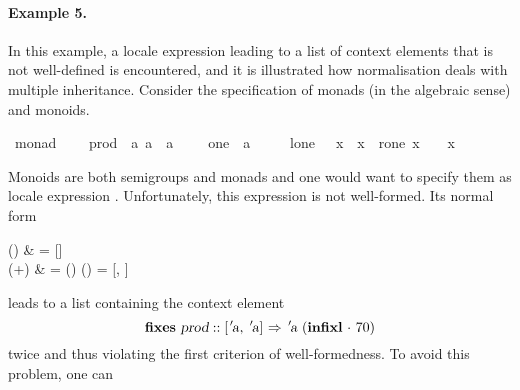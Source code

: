\begin{isabellebody}
\begin{isamarkuptext}
\paragraph{Example 5.}
  In this example, a locale expression leading to a list of context
  elements that is not well-defined is encountered, and it is illustrated
  how normalisation deals with multiple inheritance.
  Consider the specification of monads (in the algebraic sense)
  and monoids.%
\end{isamarkuptext}%
\isamarkuptrue%
\isamarkupfalse%
\ monad\ {\isacharequal}\isanewline
\ \ \ prod\ {\isacharcolon}{\isacharcolon}\ {\isachardoublequoteopen}{\isacharbrackleft}{\isacharprime}a{\isacharcomma}\ {\isacharprime}a{\isacharbrackright}\ {\isasymRightarrow}\ {\isacharprime}a{\isachardoublequoteclose}\ {\isacharparenleft}\ {\isachardoublequoteopen}{\isasymcdot}{\isachardoublequoteclose}\ {}{}{\isacharparenright}\ \ one\ {\isacharcolon}{\isacharcolon}\ {\isacharprime}a\ {\isacharparenleft}{\isachardoublequoteopen}{\isasymone}{\isachardoublequoteclose}\ {}{}{}{\isacharparenright}\isanewline
\ \ \ l{\isacharunderscore}one{\isacharcolon}\ {\isachardoublequoteopen}{\isasymone}\ {\isasymcdot}\ x\ {\isacharequal}\ x{\isachardoublequoteclose}\ \ r{\isacharunderscore}one{\isacharcolon}\ {\isachardoublequoteopen}x\ {\isasymcdot}\ {\isasymone}\ {\isacharequal}\ x{\isachardoublequoteclose}%
\begin{isamarkuptext}%
Monoids are both semigroups and monads and one would want to
  specify them as locale expression .
  Unfortunately, this expression is not well-formed.  Its normal form
\begin{align*%
}
  \N() & = [] \\
  \N(+) & =
       \N() \App \N()
     = [, ]
\end{align*%
}
  leads to a list containing the context element
\[
  \textbf{fixes}~\isa{prod} :: \isa{{\isachardoublequote}{\isacharbrackleft}{\isacharprime}a{\isacharcomma}\ {\isacharprime}a{\isacharbrackright}\ {\isasymRightarrow}\ {\isacharprime}a{\isachardoublequote}}
    ~(\textbf{infixl}~\isa{{\isachardoublequote}{\isasymcdot}{\isachardoublequote}}~70)
\]
  twice and thus violating the first criterion of well-formedness.  To
  avoid this problem, one can

\end{isamarkuptext}
\end{isabellebody}
